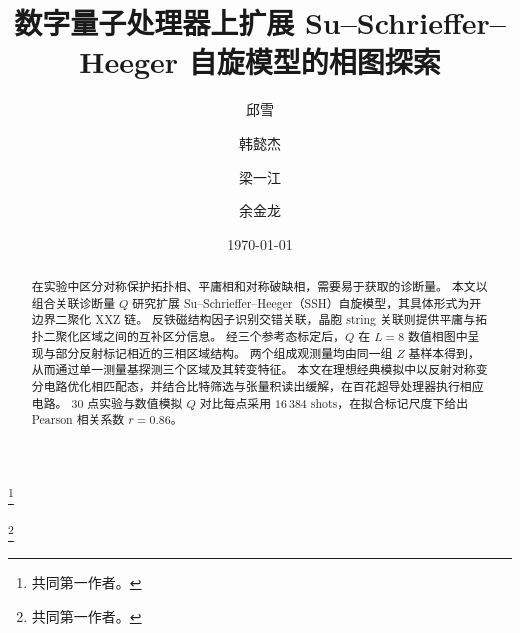 \documentclass[aps,pra,reprint,groupedaddress,floatfix]{revtex4-2}
\begin{document}
\title{数字量子处理器上扩展 Su--Schrieffer--Heeger 自旋模型的相图探索}

\author{邱雪}\thanks{共同第一作者。}
\author{韩懿杰}\thanks{共同第一作者。}
\author{梁一江}
\author{余金龙}

\date{\today}

\begin{abstract}
在实验中区分对称保护拓扑相、平庸相和对称破缺相，需要易于获取的诊断量。
本文以组合关联诊断量 $Q$ 研究扩展 Su--Schrieffer--Heeger（SSH）自旋模型，其具体形式为开边界二聚化 XXZ 链。
反铁磁结构因子识别交错关联，晶胞 string 关联则提供平庸与拓扑二聚化区域之间的互补区分信息。
经三个参考态标定后，$Q$ 在 $L=8$ 数值相图中呈现与部分反射标记相近的三相区域结构。
两个组成观测量均由同一组 $Z$ 基样本得到，从而通过单一测量基探测三个区域及其转变特征。
本文在理想经典模拟中以反射对称变分电路优化相匹配态，并结合比特筛选与张量积读出缓解，在百花超导处理器执行相应电路。
$30$ 点实验与数值模拟 $Q$ 对比每点采用 $16\,384$ shots，在拟合标记尺度下给出 Pearson 相关系数 $r=0.86$。
\end{abstract}

\maketitle


\FloatBarrier

\FloatBarrier

\FloatBarrier

\FloatBarrier

\FloatBarrier



\FloatBarrier

\FloatBarrier


\FloatBarrier


\end{document}
